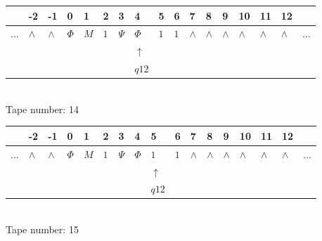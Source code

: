\documentclass[11pt]{article}
\begin{document}
\begin{table}[H]
\centering
\begin{tabular}{lllllllllllllllll}
 & -2 & -1 & 0 & 1 & 2 & 3 & 4 & 5 & 6 & 7 & 8 & 9 & 10 & 11 & 12 & \\
\hline
$...$ & \multicolumn{1}{|l|}{$\wedge$} & \multicolumn{1}{|l|}{$\wedge$} & \multicolumn{1}{|l|}{$\Phi$} & \multicolumn{1}{|l|}{$M$} & \multicolumn{1}{|l|}{$1$} & \multicolumn{1}{|l|}{$\Psi$} & \multicolumn{1}{|l|}{$\Phi$} & \multicolumn{1}{|l|}{$1$} & \multicolumn{1}{|l|}{$1$} & \multicolumn{1}{|l|}{$\wedge$} & \multicolumn{1}{|l|}{$\wedge$} & \multicolumn{1}{|l|}{$\wedge$} & \multicolumn{1}{|l|}{$\wedge$} & \multicolumn{1}{|l|}{$\wedge$} & \multicolumn{1}{|l|}{$\wedge$} & $...$\\
\hline
&  &  &  &  &  &  & $\uparrow$ &  &  &  &  &  &  &  &  &  \\
&  &  &  &  &  &  & $ q12 $ &  &  &  &  &  &  &  &  &  \\
\end{tabular}
\\
Tape number: 14
\noindent\makebox[\linewidth]{\hdashrule{\textwidth}{1pt}{1pt}}\end{table}

\begin{table}[H]
\centering
\begin{tabular}{lllllllllllllllll}
 & -2 & -1 & 0 & 1 & 2 & 3 & 4 & 5 & 6 & 7 & 8 & 9 & 10 & 11 & 12 & \\
\hline
$...$ & \multicolumn{1}{|l|}{$\wedge$} & \multicolumn{1}{|l|}{$\wedge$} & \multicolumn{1}{|l|}{$\Phi$} & \multicolumn{1}{|l|}{$M$} & \multicolumn{1}{|l|}{$1$} & \multicolumn{1}{|l|}{$\Psi$} & \multicolumn{1}{|l|}{$\Phi$} & \multicolumn{1}{|l|}{$1$} & \multicolumn{1}{|l|}{$1$} & \multicolumn{1}{|l|}{$\wedge$} & \multicolumn{1}{|l|}{$\wedge$} & \multicolumn{1}{|l|}{$\wedge$} & \multicolumn{1}{|l|}{$\wedge$} & \multicolumn{1}{|l|}{$\wedge$} & \multicolumn{1}{|l|}{$\wedge$} & $...$\\
\hline
&  &  &  &  &  &  &  & $\uparrow$ &  &  &  &  &  &  &  &  \\
&  &  &  &  &  &  &  & $ q12 $ &  &  &  &  &  &  &  &  \\
\end{tabular}
\\
Tape number: 15
\noindent\makebox[\linewidth]{\hdashrule{\textwidth}{1pt}{1pt}}\end{table}
\end{document}

